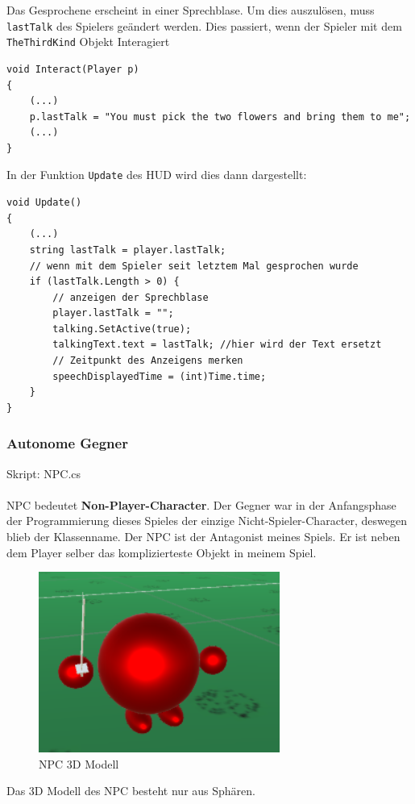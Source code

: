 Das Gesprochene erscheint in einer Sprechblase. Um dies auszulösen, muss \lstinline{lastTalk} des Spielers geändert werden.
Dies passiert, wenn der Spieler mit dem \lstinline{TheThirdKind} Objekt Interagiert 
\begin{lstlisting}[caption={Setzen des Sprechinhaltes}]
void Interact(Player p)
{
	(...)
	p.lastTalk = "You must pick the two flowers and bring them to me";
	(...)
}
\end{lstlisting}

In der Funktion \lstinline{Update} des HUD wird dies dann dargestellt:
 
\begin{lstlisting}[caption={Gesprochenes aktualisieren}]
void Update()
{
	(...)
	string lastTalk = player.lastTalk;
	// wenn mit dem Spieler seit letztem Mal gesprochen wurde
	if (lastTalk.Length > 0) {
		// anzeigen der Sprechblase
		player.lastTalk = "";
		talking.SetActive(true);
		talkingText.text = lastTalk; //hier wird der Text ersetzt
		// Zeitpunkt des Anzeigens merken
		speechDisplayedTime = (int)Time.time;
	} 
}
\end{lstlisting}


\subsubsection{Autonome Gegner}
\label{subsubsec:npc}
Skript: NPC.cs\\\\
NPC bedeutet \textbf{Non-Player-Character}. Der Gegner war in der Anfangsphase der Programmierung dieses Spieles der einzige Nicht-Spieler-Character, deswegen blieb der Klassenname. Der NPC ist der Antagonist meines Spiels.
Er ist neben dem Player selber das komplizierteste Objekt in meinem Spiel.

\begin{figure}[H]
\includegraphics[scale=1]{screenshots/npc.png}
\caption{NPC 3D Modell}
\end{figure}
Das 3D Modell des NPC besteht nur aus Sphären.

